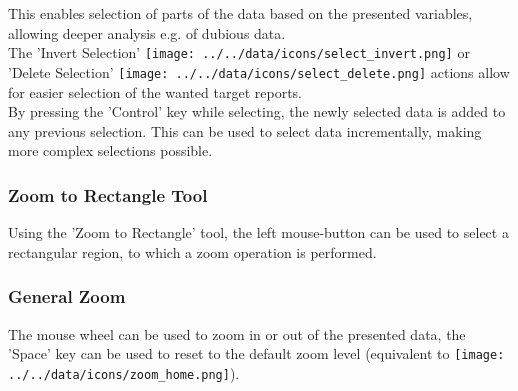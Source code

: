This enables selection of parts of the data based on the presented variables, allowing deeper analysis e.g. of dubious data. \\

The 'Invert Selection' \texttt{[image: ../../data/icons/select\_invert.png]} or 'Delete Selection' \texttt{[image: ../../data/icons/select\_delete.png]} actions 
allow for easier selection of the wanted target reports. \\

By pressing the 'Control' key while selecting, the newly selected data is added to any previous selection. This can be used to select data incrementally, making more complex selections possible.

\subsubsection{Zoom to Rectangle Tool}

Using the 'Zoom to Rectangle' tool, the left mouse-button can be used to select a rectangular region, to which a zoom operation is performed.

\subsubsection{General Zoom}

The mouse wheel can be used to zoom in or out of the presented data, the 'Space' key can be used to reset to the default zoom level (equivalent to \texttt{[image: ../../data/icons/zoom\_home.png]}).
